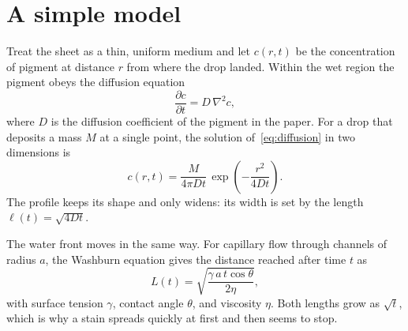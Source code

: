 \section{A simple model}

Treat the sheet as a thin, uniform medium and let $c(r,t)$
be the concentration of pigment at distance $r$ from where
the drop landed. Within the wet region the pigment obeys
the diffusion equation
\begin{equation}
  \frac{\partial c}{\partial t} = D\,\nabla^2 c,
  \label{eq:diffusion}
\end{equation}
where $D$ is the diffusion coefficient of the pigment in
the paper. For a drop that deposits a mass $M$ at a single
point, the solution of~\eqref{eq:diffusion} in two
dimensions is
\begin{equation}
  c(r,t) = \frac{M}{4\pi D t}\,
           \exp\!\left(-\frac{r^2}{4 D t}\right).
  \label{eq:solution}
\end{equation}
The profile keeps its shape and only widens: its width is
set by the length $\ell(t) = \sqrt{4 D t}$.

The water front moves in the same way. For capillary flow
through channels of radius $a$, the Washburn equation
gives the distance reached after time $t$ as
\begin{equation}
  L(t) = \sqrt{\frac{\gamma\, a\, t \cos\theta}{2\eta}},
  \label{eq:washburn}
\end{equation}
with surface tension $\gamma$, contact angle $\theta$, and
viscosity $\eta$. Both lengths grow as $\sqrt{t}$, which
is why a stain spreads quickly at first and then seems to
stop.
